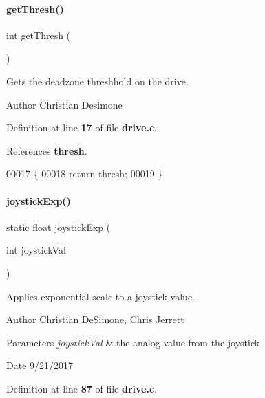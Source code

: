 \paragraph{get\+Thresh()}
{\footnotesize\ttfamily int get\+Thresh (\begin{DoxyParamCaption}{ }\end{DoxyParamCaption})}



Gets the deadzone threshhold on the drive. 

\begin{DoxyAuthor}{Author}
Christian Desimone 
\end{DoxyAuthor}


Definition at line \textbf{ 17} of file \textbf{ drive.\+c}.



References \textbf{ thresh}.


\begin{DoxyCode}
00017                \{
00018   \textcolor{keywordflow}{return} thresh;
00019 \}
\end{DoxyCode}
\mbox{\label{drive_8c_a6de4fbb9197f2f350c53a9f8bf23a8f1}} 
\paragraph{joystick\+Exp()}
{\footnotesize\ttfamily static float joystick\+Exp (\begin{DoxyParamCaption}\item[{int}]{joystick\+Val }\end{DoxyParamCaption})\hspace{0.3cm}{\ttfamily [static]}}



Applies exponential scale to a joystick value. 

\begin{DoxyAuthor}{Author}
Christian De\+Simone, Chris Jerrett 
\end{DoxyAuthor}

\begin{DoxyParams}{Parameters}
{\em joystick\+Val} & the analog value from the joystick \\
\hline
\end{DoxyParams}
\begin{DoxyDate}{Date}
9/21/2017 
\end{DoxyDate}


Definition at line \textbf{ 87} of file \textbf{ drive.\+c}.



